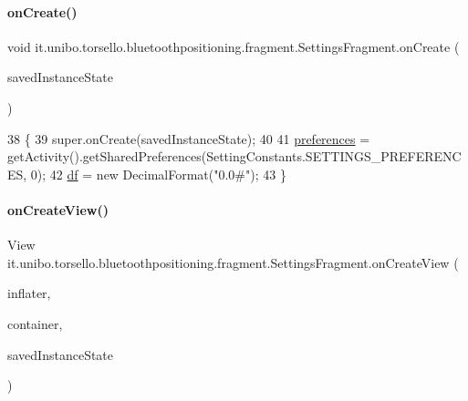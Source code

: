 \paragraph{\texorpdfstring{on\+Create()}{onCreate()}}
{\footnotesize\ttfamily void it.\+unibo.\+torsello.\+bluetoothpositioning.\+fragment.\+Settings\+Fragment.\+on\+Create (\begin{DoxyParamCaption}\item[{Bundle}]{saved\+Instance\+State }\end{DoxyParamCaption})}


\begin{DoxyCode}
38                                                     \{
39         super.onCreate(savedInstanceState);
40 
41         \hyperlink{classit_1_1unibo_1_1torsello_1_1bluetoothpositioning_1_1fragment_1_1SettingsFragment_a52480c4d5d81ca59fe4a98ae3c623ea4_a52480c4d5d81ca59fe4a98ae3c623ea4}{preferences} = getActivity().getSharedPreferences(SettingConstants.SETTINGS\_PREFERENCES, 
      0);
42         \hyperlink{classit_1_1unibo_1_1torsello_1_1bluetoothpositioning_1_1fragment_1_1SettingsFragment_af6b80a700dc80c39a56d001b68a47694_af6b80a700dc80c39a56d001b68a47694}{df} = \textcolor{keyword}{new} DecimalFormat(\textcolor{stringliteral}{"0.0#"});
43     \}
\end{DoxyCode}
\hypertarget{classit_1_1unibo_1_1torsello_1_1bluetoothpositioning_1_1fragment_1_1SettingsFragment_ac1c9d47777382cc2c74b7b1cf3d6ccd7_ac1c9d47777382cc2c74b7b1cf3d6ccd7}{}\label{classit_1_1unibo_1_1torsello_1_1bluetoothpositioning_1_1fragment_1_1SettingsFragment_ac1c9d47777382cc2c74b7b1cf3d6ccd7_ac1c9d47777382cc2c74b7b1cf3d6ccd7} 
\paragraph{\texorpdfstring{on\+Create\+View()}{onCreateView()}}
{\footnotesize\ttfamily View it.\+unibo.\+torsello.\+bluetoothpositioning.\+fragment.\+Settings\+Fragment.\+on\+Create\+View (\begin{DoxyParamCaption}\item[{Layout\+Inflater}]{inflater,  }\item[{View\+Group}]{container,  }\item[{Bundle}]{saved\+Instance\+State }\end{DoxyParamCaption})}



